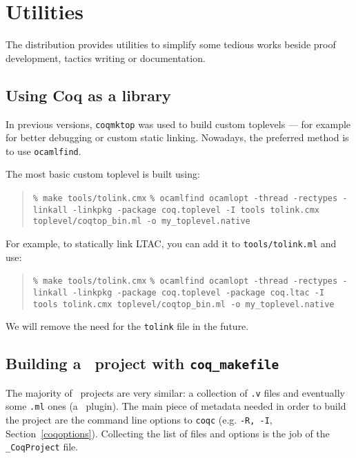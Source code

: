\chapter[Utilities]{Utilities\label{Utilities}}

The distribution provides utilities to simplify some tedious works
beside proof development, tactics writing or documentation.

\section[Using Coq as a library]{Using Coq as a library}

In previous versions, \texttt{coqmktop} was used to build custom
toplevels --- for example for better debugging or custom static
linking. Nowadays, the preferred method is to use \texttt{ocamlfind}.

The most basic custom toplevel is built using:
\begin{quotation}
\texttt{\% make tools/tolink.cmx}
\texttt{\% ocamlfind ocamlopt -thread -rectypes -linkall -linkpkg
  -package coq.toplevel -I tools tolink.cmx toplevel/coqtop\_bin.ml -o my\_toplevel.native}
\end{quotation}

For example, to statically link LTAC, you can add it to \texttt{tools/tolink.ml} and use:
\begin{quotation}
\texttt{\% make tools/tolink.cmx}
\texttt{\% ocamlfind ocamlopt -thread -rectypes -linkall -linkpkg
  -package coq.toplevel -package coq.ltac -I tools tolink.cmx toplevel/coqtop\_bin.ml -o my\_toplevel.native}
\end{quotation}

We will remove the need for the \texttt{tolink} file in the future.


\section[Building a \Coq\ project with {\tt coq\_makefile}]
{Building a \Coq\ project with {\tt coq\_makefile}
\label{Makefile}
}

The majority of \Coq\ projects are very similar: a collection of {\tt .v}
files and eventually some {\tt .ml} ones (a \Coq\ plugin).  The main piece
of metadata needed in order to build the project are the command
line options to {\tt coqc} (e.g. {\tt -R, -I},
\SeeAlso Section~\ref{coqoptions}). Collecting the list of files and
options is the job of the {\tt \_CoqProject} file.

